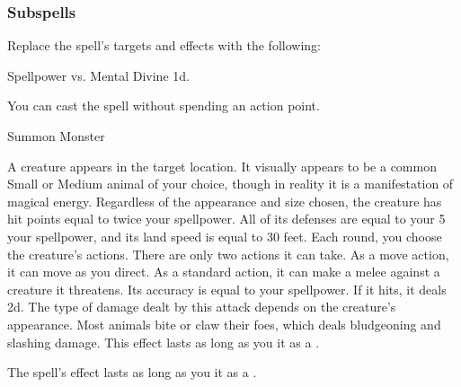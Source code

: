 \subsubsection{Subspells}
Replace the spell's targets and effects with the following:
\begin{spellcontent}
\begin{augmenttargetinginfo}
\end{augmenttargetinginfo}
\begin{augmenteffects}
\begin{spellattack}{Spellpower vs. Mental}
\spellsuccess Divine  \minus1d.
\end{spellattack}
\end{augmenteffects}
\end{spellcontent}
You can cast the spell without spending an action point.
\begin{spellsection}{Summon Monster}
\begin{spellheader}
\end{spellheader}
\begin{spellcontent}
\begin{spelltargetinginfo}
\end{spelltargetinginfo}
\begin{spelleffects}
\spelleffect
A creature appears in the target location.
It visually appears to be a common Small or Medium animal of your choice, though in reality it is a manifestation of magical energy.
Regardless of the appearance and size chosen, the creature has hit points equal to twice your spellpower.
All of its defenses are equal to your 5 \add your spellpower, and its land speed is equal to 30 feet.
Each round, you choose the creature's actions.
There are only two actions it can take.
As a move action, it can move as you direct.
As a standard action, it can make a melee  against a creature it threatens.
Its accuracy is equal to your spellpower.
If it hits, it deals  \minus2d.
The type of damage dealt by this attack depends on the creature's appearance.
Most animals bite or claw their foes, which deals bludgeoning and slashing damage.
This effect lasts as long as you  it as a .
\end{spelleffects}
\end{spellcontent}
\begin{spellfooter}
\end{spellfooter}
\begin{spellsubcontent}
\begin{spellcantrip}
The spell's effect lasts as long as you  it as a .
\end{spellcantrip}
\end{spellsubcontent}
\end{spellsection}
